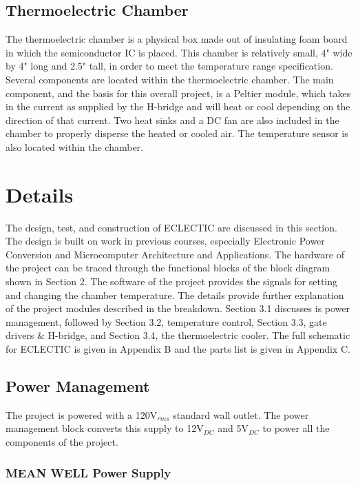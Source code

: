 \documentclass[11pt,letter]{article}
\begin{document}
\subsection{Thermoelectric Chamber} %

The thermoelectric chamber is a physical box made out of insulating foam board in which the semiconductor IC is placed. This chamber is relatively small, 4" wide by 4" long and 2.5" tall, in order to meet the temperature range specification. Several components are located within the thermoelectric chamber. The main component, and the basis for this overall project, is a Peltier module, which takes in the current as supplied by the H-bridge and will heat or cool depending on the direction of that current. Two heat sinks and a DC fan are also included in the chamber to properly disperse the heated or cooled air. The temperature sensor is also located within the chamber. 


\section{Details}

The design, test, and construction of ECLECTIC are discussed in this section. The design is built on work in previous courses, especially Electronic Power Conversion and Microcomputer Architecture and Applications. The hardware of the project can be traced through the functional blocks of the block diagram shown in Section 2. The software of the project provides the signals for setting and changing the chamber temperature. The details provide further explanation of the project modules described in the breakdown. Section 3.1 discusses is power management, followed by Section 3.2, temperature control, Section 3.3, gate drivers $\&$ H-bridge, and Section 3.4, the thermoelectric cooler. The full schematic for ECLECTIC is given in Appendix B and the parts list is given in Appendix C. 

\subsection{Power Management}

The project is powered with a 120V$_{rms}$ standard wall outlet. The power management block converts this supply to 12V$_{DC}$ and 5V$_{DC}$ to power all the components of the project.

\subsubsection{MEAN WELL Power Supply}
\end{document}
